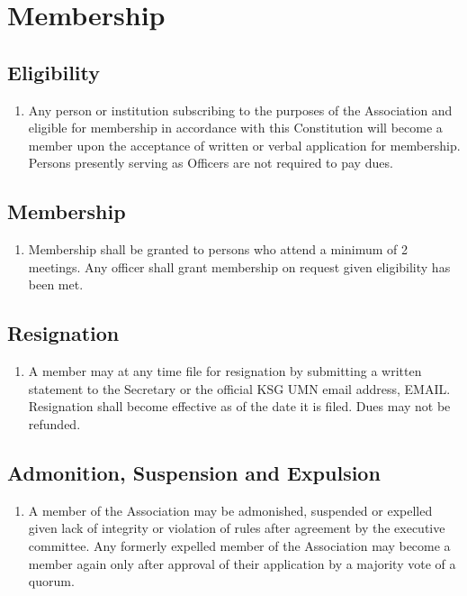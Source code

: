 \documentclass[12pt,letterpaper]{article}
\begin{document}
\section{Membership}

\subsection{Eligibility}
\begin{enumerate}
  \item Any person or institution subscribing to the purposes of the Association
        and eligible for membership in accordance with this Constitution will
        become a member upon the acceptance of written or verbal application
        for membership. Persons presently serving as Officers are not required to
        pay dues.
\end{enumerate}

\subsection{Membership}
\begin{enumerate}
  \item Membership shall be granted to persons who attend a minimum of 2 meetings.
        Any officer shall grant membership on request given eligibility has been met.
\end{enumerate}

\subsection{Resignation}
\begin{enumerate}
  \item A member may at any time file for resignation by submitting a written
        statement to the Secretary or the official KSG UMN email address,
        EMAIL. Resignation shall become effective as of the date it is filed.
        Dues may not be refunded.
\end{enumerate}

\subsection{Admonition, Suspension and Expulsion}
\begin{enumerate}
  \item A member of the Association may be admonished, suspended or expelled
        given lack of integrity or violation of rules after agreement by
        the executive committee. Any formerly expelled member of the Association
        may become a member again only after approval of their application by
        a majority vote of a quorum.
\end{enumerate}
\end{document}
